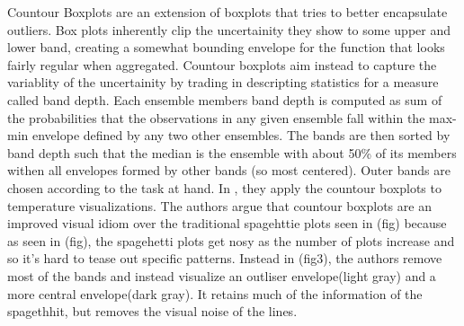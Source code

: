 Countour Boxplots \cite{Whitaker2013} are an extension of boxplots that tries to better encapsulate outliers. Box plots inherently clip the uncertainity they show to some upper and lower band, 
creating a somewhat bounding envelope for the function that looks fairly regular when aggregated. Countour boxplots aim instead to capture the variablity of the uncertainity by trading in descripting
statistics for a measure called band depth. Each ensemble members band depth is computed as sum of the probabilities that the observations in any given ensemble fall within the max-min envelope defined by any two other ensembles. The bands are then sorted by band depth such that the median is the ensemble with about 50\% of its members withen all envelopes formed by other bands (so most centered). Outer bands are chosen according to the task at hand. In \cite{Whitaker2013}, they apply the countour boxplots to temperature visualizations. %
The authors argue that countour boxplots are an improved visual idiom over the traditional spagehttie plots seen in (fig) because as seen in (fig), the spagehetti plots get nosy as the number of plots increase and so it's hard to tease out specific patterns. Instead in (fig3), the authors remove most of the bands and instead visualize an outliser envelope(light gray) and a more central envelope(dark gray). It retains much of the information of the spagethhit, but removes the visual noise of the lines.  
